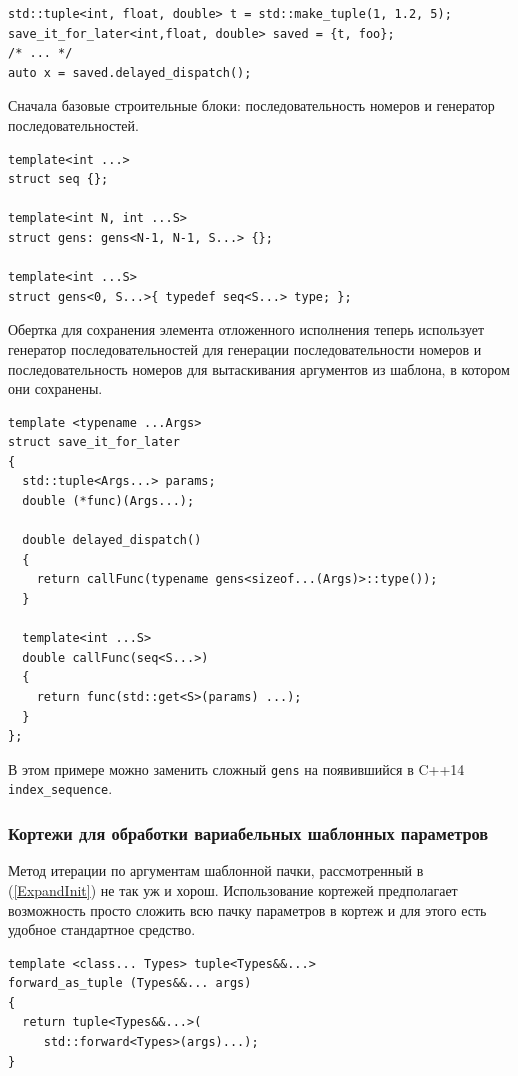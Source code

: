 \documentclass[a4paper,12pt,oneside]{article}
\begin{document}
\begin{lstlisting}
std::tuple<int, float, double> t = std::make_tuple(1, 1.2, 5);
save_it_for_later<int,float, double> saved = {t, foo};
/* ... */
auto x = saved.delayed_dispatch();
\end{lstlisting}

Сначала базовые строительные блоки: последовательность номеров и генератор последовательностей.

\begin{lstlisting}
template<int ...> 
struct seq {};

template<int N, int ...S> 
struct gens: gens<N-1, N-1, S...> {};

template<int ...S> 
struct gens<0, S...>{ typedef seq<S...> type; };
\end{lstlisting}

Обертка для сохранения элемента отложенного исполнения теперь использует генератор последовательностей для генерации последовательности номеров и последовательность номеров для вытаскивания аргументов из шаблона, в котором они сохранены.

\begin{lstlisting}
template <typename ...Args>
struct save_it_for_later
{
  std::tuple<Args...> params;
  double (*func)(Args...);

  double delayed_dispatch()
  {
    return callFunc(typename gens<sizeof...(Args)>::type());
  }

  template<int ...S>
  double callFunc(seq<S...>)
  {
    return func(std::get<S>(params) ...);
  }
};
\end{lstlisting}

В этом примере можно заменить сложный \lstinline!gens! на появившийся в C++14 \lstinline!index_sequence!.

\subsubsection{Кортежи для обработки вариабельных шаблонных параметров}\label{ExpandTuple}

Метод итерации по аргументам шаблонной пачки, рассмотренный в (\ref{ExpandInit}) не так уж и хорош. Использование кортежей предполагает возможность просто сложить всю пачку параметров в кортеж и для этого есть удобное стандартное средство.

\begin{lstlisting}
template <class... Types> tuple<Types&&...> 
forward_as_tuple (Types&&... args)
{
  return tuple<Types&&...>(
     std::forward<Types>(args)...);
} 
\end{lstlisting}
\end{document}
